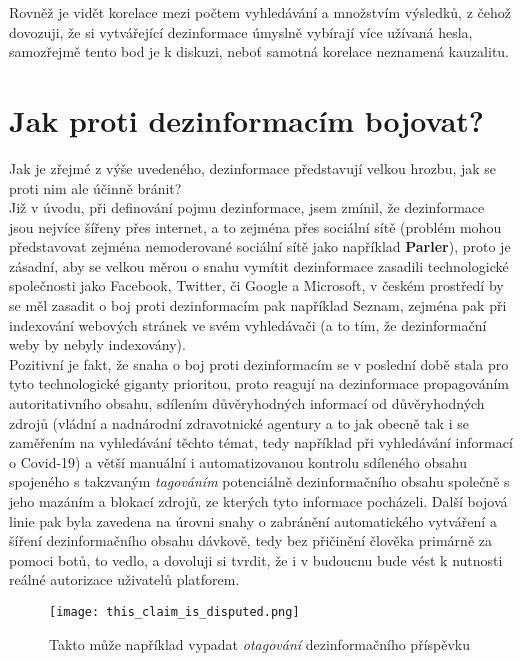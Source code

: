 Rovněž je vidět korelace mezi počtem vyhledávání a množstvím výsledků, z čehož dovozuji, že si vytvářející dezinformace úmyslně vybírají více užívaná hesla, samozřejmě tento bod je k diskuzi, neboť samotná korelace neznamená kauzalitu.\\

\newpage

\section{Jak proti dezinformacím bojovat?}

Jak je zřejmé z výše uvedeného, dezinformace představují velkou hrozbu, jak se proti nim ale účinně bránit?\\

Již v úvodu, při definování pojmu dezinformace, jsem zmínil, že dezinformace jsou nejvíce šířeny přes internet, a to zejména přes sociální sítě (problém mohou představovat zejména nemoderované sociální sítě jako například \textbf{Parler}), proto je zásadní, aby se velkou měrou o snahu vymítit dezinformace zasadili technologické společnosti jako Facebook, Twitter, či Google a Microsoft, v českém prostředí by se měl zasadit o boj proti dezinformacím pak například Seznam, zejména pak při indexování webových stránek ve svém vyhledávači (a to tím, že dezinformační weby by nebyly indexovány).\\

Pozitivní je fakt, že snaha o boj proti dezinformacím se v poslední době stala pro tyto technologické giganty prioritou, proto reagují na dezinformace propagováním autoritativního obsahu, sdílením důvěryhodných informací od důvěryhodných zdrojů (vládní a nadnárodní zdravotnické agentury a to jak obecně tak i se zaměřením na vyhledávání těchto témat, tedy například při vyhledávání informací o Covid-19) a větší manuální i automatizovanou kontrolu sdíleného obsahu spojeného s takzvaným \textit{tagováním} potenciálně dezinformačního obsahu společně s jeho mazáním a blokací zdrojů, ze kterých tyto informace pocházeli. Další bojová linie pak byla zavedena na úrovni snahy o zabránění automatického vytváření a šíření dezinformačního obsahu dávkově, tedy bez přičinění člověka primárně za pomoci botů, to vedlo, a dovoluji si tvrdit, že i v budoucnu bude vést k nutnosti reálné autorizace uživatelů platforem.\\

\begin{figure}[htbp]
  \centering
  \texttt{[image: this\_claim\_is\_disputed.png]}
  \caption{Takto může například vypadat \textit{otagování} dezinformačního příspěvku}
  \label{fig:google trends}
\end{figure}

